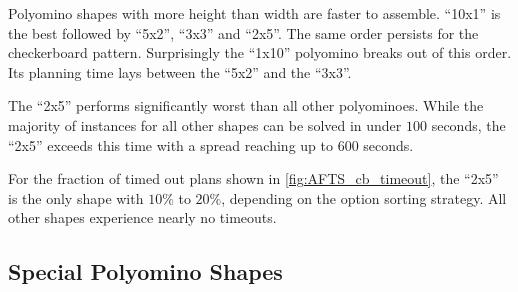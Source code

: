 Polyomino shapes with more height than width are faster to assemble.
``10x1'' is the best followed by ``5x2'', ``3x3'' and ``2x5''.
The same order persists for the checkerboard pattern.
Surprisingly the ``1x10'' polyomino breaks out of this order.
Its planning time lays between the ``5x2'' and the ``3x3''.

The ``2x5'' performs significantly worst than all other polyominoes.
While the majority of instances for all other shapes can be solved in under $100$ seconds, the ``2x5'' exceeds this time with a spread reaching up to $600$ seconds.

For the fraction of timed out plans shown in \autoref{fig:AFTS_cb_timeout}, the ``2x5'' is the only shape with $10\%$ to $20\%$, depending on the option sorting strategy.
All other shapes experience nearly no timeouts.

\subsection{Special Polyomino Shapes}
\label{sec:special_poly}

